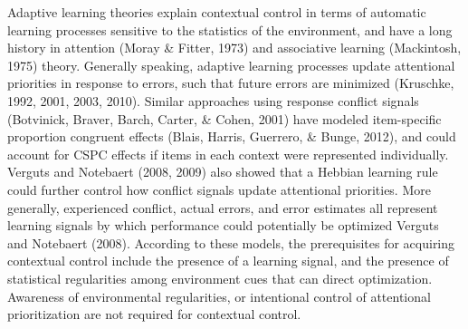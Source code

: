 \documentclass[english,,man,floatsintext]{apa6}
\begin{document}
Adaptive learning theories explain contextual control in terms of
automatic learning processes sensitive to the statistics of the
environment, and have a long history in attention (Moray \& Fitter,
1973) and associative learning (Mackintosh, 1975) theory. Generally
speaking, adaptive learning processes update attentional priorities in
response to errors, such that future errors are minimized (Kruschke,
1992, 2001, 2003, 2010). Similar approaches using response conflict
signals (Botvinick, Braver, Barch, Carter, \& Cohen, 2001) have modeled
item-specific proportion congruent effects (Blais, Harris, Guerrero, \&
Bunge, 2012), and could account for CSPC effects if items in each
context were represented individually. Verguts and Notebaert (2008,
2009) also showed that a Hebbian learning rule could further control how
conflict signals update attentional priorities. More generally,
experienced conflict, actual errors, and error estimates all represent
learning signals by which performance could potentially be optimized
Verguts and Notebaert (2008). According to these models, the
prerequisites for acquiring contextual control include the presence of a
learning signal, and the presence of statistical regularities among
environment cues that can direct optimization. Awareness of
environmental regularities, or intentional control of attentional
prioritization are not required for contextual control.
\end{document}
